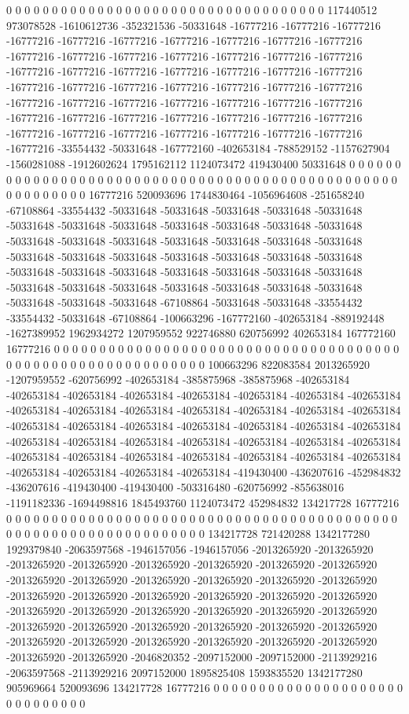 0 0 0 0 0 0 0 0 0 0 0 0 0 0 0 0 0 0 0 0 0 0 0 0 0 0 0 0 0 0 0 0 0 0 0 117440512 973078528 -1610612736 -352321536 -50331648 -16777216 -16777216 -16777216 -16777216 -16777216 -16777216 -16777216 -16777216 -16777216 -16777216 -16777216 -16777216 -16777216 -16777216 -16777216 -16777216 -16777216 -16777216 -16777216 -16777216 -16777216 -16777216 -16777216 -16777216 -16777216 -16777216 -16777216 -16777216 -16777216 -16777216 -16777216 -16777216 -16777216 -16777216 -16777216 -16777216 -16777216 -16777216 -16777216 -16777216 -16777216 -16777216 -16777216 -16777216 -16777216 -16777216 -16777216 -16777216 -16777216 -16777216 -16777216 -16777216 -16777216 -33554432 -50331648 -167772160 -402653184 -788529152 -1157627904 -1560281088 -1912602624 1795162112 1124073472 419430400 50331648 0 0 0 0 0 0 0 0 0 0 0 0 0 0 0 0 0 0 0 0 0 0 0
0 0 0 0 0 0 0 0 0 0 0 0 0 0 0 0 0 0 0 0 0 0 0 0 0 0 0 0 0 0 0 0 0 0 0 16777216 520093696 1744830464 -1056964608 -251658240 -67108864 -33554432 -50331648 -50331648 -50331648 -50331648 -50331648 -50331648 -50331648 -50331648 -50331648 -50331648 -50331648 -50331648 -50331648 -50331648 -50331648 -50331648 -50331648 -50331648 -50331648 -50331648 -50331648 -50331648 -50331648 -50331648 -50331648 -50331648 -50331648 -50331648 -50331648 -50331648 -50331648 -50331648 -50331648 -50331648 -50331648 -50331648 -50331648 -50331648 -50331648 -50331648 -50331648 -50331648 -50331648 -67108864 -50331648 -50331648 -33554432 -33554432 -50331648 -67108864 -100663296 -167772160 -402653184 -889192448 -1627389952 1962934272 1207959552 922746880 620756992 402653184 167772160 16777216 0 0 0 0 0 0 0 0 0 0 0 0 0 0 0 0 0 0 0 0 0 0 0 0
0 0 0 0 0 0 0 0 0 0 0 0 0 0 0 0 0 0 0 0 0 0 0 0 0 0 0 0 0 0 0 0 0 0 0 0 100663296 822083584 2013265920 -1207959552 -620756992 -402653184 -385875968 -385875968 -402653184 -402653184 -402653184 -402653184 -402653184 -402653184 -402653184 -402653184 -402653184 -402653184 -402653184 -402653184 -402653184 -402653184 -402653184 -402653184 -402653184 -402653184 -402653184 -402653184 -402653184 -402653184 -402653184 -402653184 -402653184 -402653184 -402653184 -402653184 -402653184 -402653184 -402653184 -402653184 -402653184 -402653184 -402653184 -402653184 -402653184 -402653184 -402653184 -402653184 -419430400 -436207616 -452984832 -436207616 -419430400 -419430400 -503316480 -620756992 -855638016 -1191182336 -1694498816 1845493760 1124073472 452984832 134217728 16777216 0 0 0 0 0 0 0 0 0 0 0 0 0 0 0 0 0 0 0 0 0 0 0 0 0 0 0 0
0 0 0 0 0 0 0 0 0 0 0 0 0 0 0 0 0 0 0 0 0 0 0 0 0 0 0 0 0 0 0 0 0 0 0 0 0 134217728 721420288 1342177280 1929379840 -2063597568 -1946157056 -1946157056 -2013265920 -2013265920 -2013265920 -2013265920 -2013265920 -2013265920 -2013265920 -2013265920 -2013265920 -2013265920 -2013265920 -2013265920 -2013265920 -2013265920 -2013265920 -2013265920 -2013265920 -2013265920 -2013265920 -2013265920 -2013265920 -2013265920 -2013265920 -2013265920 -2013265920 -2013265920 -2013265920 -2013265920 -2013265920 -2013265920 -2013265920 -2013265920 -2013265920 -2013265920 -2013265920 -2013265920 -2013265920 -2013265920 -2013265920 -2013265920 -2046820352 -2097152000 -2097152000 -2113929216 -2063597568 -2113929216 2097152000 1895825408 1593835520 1342177280 905969664 520093696 134217728 16777216 0 0 0 0 0 0 0 0 0 0 0 0 0 0 0 0 0 0 0 0 0 0 0 0 0 0 0 0 0 0
